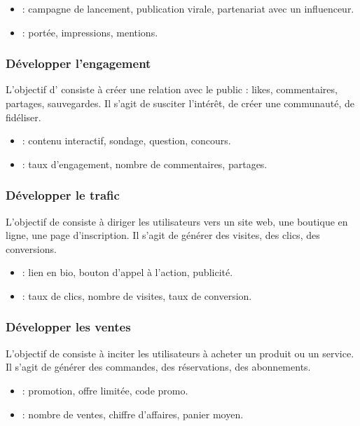 \begin{itemize}
    \item {} : campagne de lancement, publication virale, partenariat avec un influenceur.
    \item {} : portée, impressions, mentions.
\end{itemize}

\subsubsection{Développer l'engagement}

L'objectif d' consiste à créer une relation avec le public : likes, commentaires, partages, sauvegardes. Il s'agit de susciter l'intérêt, de créer une communauté, de fidéliser.

\begin{itemize}
    \item {} : contenu interactif, sondage, question, concours.
    \item {} : taux d'engagement, nombre de commentaires, partages.
\end{itemize}

\subsubsection{Développer le trafic}

L'objectif de  consiste à diriger les utilisateurs vers un site web, une boutique en ligne, une page d'inscription. Il s'agit de générer des visites, des clics, des conversions.

\begin{itemize}
    \item {} : lien en bio, bouton d'appel à l'action, publicité.
    \item {} : taux de clics, nombre de visites, taux de conversion.
\end{itemize}

\subsubsection{Développer les ventes}

L'objectif de  consiste à inciter les utilisateurs à acheter un produit ou un service. Il s'agit de générer des commandes, des réservations, des abonnements.

\begin{itemize}
    \item {} : promotion, offre limitée, code promo.
    \item {} : nombre de ventes, chiffre d'affaires, panier moyen.
\end{itemize}

